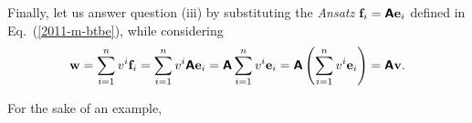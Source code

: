 Finally, let us answer question (iii)
by substituting the {\it Ansatz} ${\bf f}_i  =\textsf{\textbf{A}}{\bf e}_i$ defined in  Eq.~(\ref{2011-m-btbe}),
while considering
\begin{equation}
{\bf w}= \sum_{i=1}^n v^i {\bf f}_i  = \sum_{i=1}^n v^i \textsf{\textbf{A}}{\bf e}_i= \textsf{\textbf{A}} \sum_{i=1}^n v^i {\bf e}_i
= \textsf{\textbf{A}} \left( \sum_{i=1}^n v^i {\bf e}_i \right)
=   \textsf{\textbf{A}}{\bf v}
.
\end{equation}


{
\color{blue}
\bexample
For the sake of an example,
\begin{enumerate}


\end{enumerate}}
